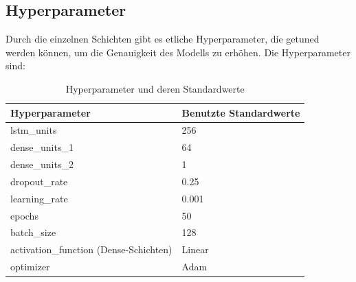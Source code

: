 \documentclass{article}
\begin{document}
\subsection{Hyperparameter}
Durch die einzelnen Schichten gibt es etliche Hyperparameter, die getuned werden können, um die Genauigkeit des Modells zu erhöhen. 
Die Hyperparameter sind: 
\begin{table}[H]
  \centering
  \begin{tabular}{| m{5.5cm} | m{5.5cm} |}

  \hline
  \textbf{Hyperparameter} & \textbf{Benutzte Standardwerte} \\ \hline
  lstm\_units & 256 \\ \hline
  dense\_units\_1 & 64 \\ \hline
  dense\_units\_2 & 1 \\ \hline
  dropout\_rate & 0.25 \\ \hline
  learning\_rate & 0.001 \\ \hline

  epochs & 50 \\ \hline
  batch\_size & 128 \\ \hline
  activation\_function (Dense-Schichten) & Linear \\ \hline
  optimizer & Adam \\ \hline
  \end{tabular}
  \caption{Hyperparameter und deren Standardwerte}
  \label{tab:hyperparameters}
  \end{table}
\end{document}
